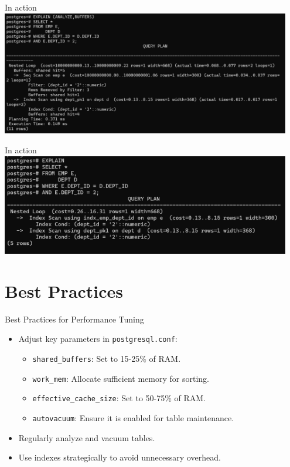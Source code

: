 \documentclass[aspectratio=169]{beamer}
\begin{document}
\begin{frame}{In action}
    \centering
    \includegraphics[width=0.95\textwidth]{figures/explain1}
\end{frame}


\begin{frame}{In action}
    \centering
    \includegraphics[width=0.95\textwidth]{figures/explain2}
\end{frame}

\section{Best Practices}

\begin{frame}{Best Practices for Performance Tuning}
    \begin{itemize}
        \item Adjust key parameters in \texttt{postgresql.conf}:
        \begin{itemize}
            \item \texttt{shared\_buffers}: Set to 15-25\% of RAM.
            \item \texttt{work\_mem}: Allocate sufficient memory for sorting.
            \item \texttt{effective\_cache\_size}: Set to 50-75\% of RAM.
            \item \texttt{autovacuum}: Ensure it is enabled for table maintenance.
        \end{itemize}
        \item Regularly analyze and vacuum tables.
        \item Use indexes strategically to avoid unnecessary overhead.
    \end{itemize}
\end{frame}
\end{document}
